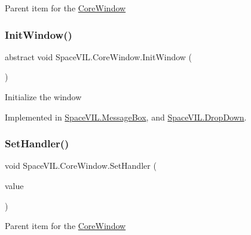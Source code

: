 Parent item for the \mbox{\hyperlink{class_space_v_i_l_1_1_core_window}{Core\+Window}} 

\mbox{\label{class_space_v_i_l_1_1_core_window_aa3cf4ac54d9651b1149584dc81042824}} 
\subsubsection{\texorpdfstring{Init\+Window()}{InitWindow()}}
{\footnotesize\ttfamily abstract void Space\+V\+I\+L.\+Core\+Window.\+Init\+Window (\begin{DoxyParamCaption}{ }\end{DoxyParamCaption})\hspace{0.3cm}{\ttfamily [pure virtual]}}



Initialize the window 



Implemented in \mbox{\hyperlink{class_space_v_i_l_1_1_message_box_ac14ecd2643e043c578ef4cf568887daf}{Space\+V\+I\+L.\+Message\+Box}}, and \mbox{\hyperlink{class_space_v_i_l_1_1_drop_down_a291f706e5ec6558798d20fa428b2ba91}{Space\+V\+I\+L.\+Drop\+Down}}.

\mbox{\label{class_space_v_i_l_1_1_core_window_a24e6d614aac5f7e1c8274edf92c214c5}} 
\subsubsection{\texorpdfstring{Set\+Handler()}{SetHandler()}}
{\footnotesize\ttfamily void Space\+V\+I\+L.\+Core\+Window.\+Set\+Handler (\begin{DoxyParamCaption}\item[{\mbox{\hyperlink{class_space_v_i_l_1_1_window_layout}{Window\+Layout}}}]{value }\end{DoxyParamCaption})}



Parent item for the \mbox{\hyperlink{class_space_v_i_l_1_1_core_window}{Core\+Window}} 


